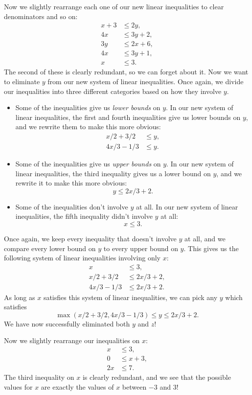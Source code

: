 Now we slightly rearrange each one of our new linear inequalities to clear denominators and so on:
\begin{align*}
x + 3 &\le 2y,\\
4x &\le 3y + 2,\\
3y &\le 2x + 6,\\
4x &\le 3y + 1,\\
x &\le 3.
\end{align*}
The second of these is clearly redundant, so we can forget about it. Now we want to eliminate $y$ from our new system of linear inequalities. Once again, we divide our inequalities into three different categories based on how they involve $y$.
\begin{itemize}
\item Some of the inequalities give us \emph{lower bounds} on $y$. In our new system of linear inequalities, the first and fourth inequalities give us lower bounds on $y$, and we rewrite them to make this more obvious:
\begin{align*}
x/2 + 3/2 &\le y,\\
4x/3 - 1/3 &\le y.
\end{align*}

\item Some of the inequalities give us \emph{upper bounds} on $y$. In our new system of linear inequalities, the third inequality gives us a lower bound on $y$, and we rewrite it to make this more obvious:
\[
y \le 2x/3 + 2.
\]

\item Some of the inequalities don't involve $y$ at all. In our new system of linear inequalities, the fifth inequality didn't involve $y$ at all:
\[
x \le 3.
\]
\end{itemize}
Once again, we keep every inequality that doesn't involve $y$ at all, and we compare every lower bound on $y$ to every upper bound on $y$. This gives us the following system of linear inequalities involving only $x$:
\begin{align*}
x &\le 3,\\
x/2 + 3/2 &\le 2x/3 + 2,\\
4x/3 - 1/3 &\le 2x/3 + 2.
\end{align*}
As long as $x$ satisfies this system of linear inequalities, we can pick any $y$ which satisfies
\[
\max(x/2 + 3/2, 4x/3 - 1/3) \le y \le 2x/3 + 2.
\]
We have now successfully eliminated both $y$ and $z$!

Now we slightly rearrange our inequalities on $x$:
\begin{align*}
x &\le 3,\\
0 &\le x + 3,\\
2x &\le 7.
\end{align*}
The third inequality on $x$ is clearly redundant, and we see that the possible values for $x$ are exactly the values of $x$ between $-3$ and $3$!

